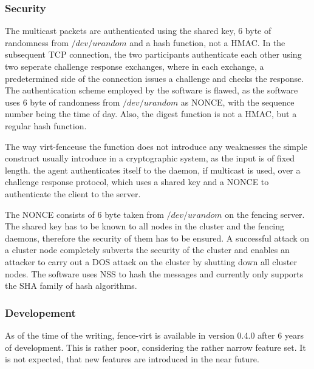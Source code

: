 \subsubsection{Security}
The multicast packets are authenticated using the shared key, 6 byte of
randomness from $/dev/urandom$ and a hash function, not a \ac{HMAC}.
In the subsequent \ac{TCP} connection, the two participants authenticate each other using
two seperate challenge response exchanges, where in each exchange, a predetermined
side of the connection issues a challenge and checks the response.
The authentication scheme employed by the software is flawed, as
the software uses 6 byte of randonness from $/dev/urandom$ as \ac{NONCE},
with the sequence number being the time of day. Also, the digest function
is not a \ac{HMAC}, but a regular hash function.

The way virt-fenceuse the function does not introduce any weaknesses the simple construct
usually introduce in a cryptographic system, as the input is of fixed length.
the agent authenticates itself to the daemon, if multicast is used,
over a challenge response protocol, which uses a shared key and a \ac{NONCE}
to authenticate the client to the server. 

The \ac{NONCE} consists of 6 byte taken from $/dev/urandom$
on the fencing server. The shared key has to be known to
all nodes in the cluster and the fencing daemons, therefore the
security of them has to be ensured. A successful attack on a cluster node
completely subverts the security of the cluster and enables an
attacker to carry out a DOS attack on the cluster by shutting down
all cluster nodes. The software uses \ac{NSS} to hash the messages
and currently only supports the \ac{SHA} family of hash algorithms.


\subsubsection{Developement}
As of the time of the writing, fence-virt is available in version 0.4.0 after
6 years of development. This is rather poor, considering the rather narrow feature
set. It is not expected, that new features are introduced in the near future.
